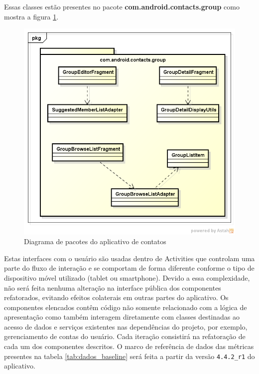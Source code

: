 Essas classes estão presentes no pacote \textbf{com.android.contacts.group} como
mostra a figura \ref{fig:classes_group_baseline}.

\begin{figure}[!h]
	\centering
	\includegraphics[scale=0.53]{img/classes_group_baseline}
	\caption{Diagrama de pacotes do aplicativo de contatos} 
	\label{fig:classes_group_baseline}
\end{figure}

Estas interfaces com o usuário são usadas dentro de Activities que controlam uma
parte do fluxo de interação e se comportam de forma diferente conforme o tipo de dispositivo
móvel utilizado (tablet ou smartphone). Devido a essa complexidade, não será
feita nenhuma alteração na interface pública dos componentes refatorados, evitando efeitos colaterais em
outras partes do aplicativo. Os componentes elencados contêm código não somente
relacionado com a lógica de apresentação como também interagem diretamente com classes destinadas ao acesso
de dados e serviços existentes nas dependências do projeto, por exemplo,
gerenciamento de contas do usuário.  Cada iteração consistirá na refatoração de
cada um dos componentes descritos. O marco de referência de dados das métricas presentes na tabela \ref{tab:dados_baseline} será feita a partir da
versão \verb|4.4.2_r1| do aplicativo.

